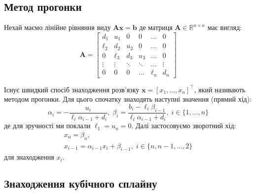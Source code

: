\documentclass[12pt]{extarticle}
\begin{document}
\subsection{Метод прогонки}\label{sub:2-3}

Нехай маємо лінійне рівняння виду $\boldsymbol{A}\mathbf{x} = \mathbf{b}$ де матриця $\boldsymbol{A} \in \mathbb{R}^{n \times n}$ має вигляд:
\[
\boldsymbol{A} = \begin{bmatrix}
    d_1 & u_1 & 0 & 0 & \dots & 0 \\
    \ell_2 & d_2 & u_2 & 0 & \dots & 0 \\
    0 & \ell_3 & d_3 & u_3 & \dots & 0 \\
    \vdots & \vdots & \ddots & \ddots & \dots & \vdots \\
    0 & 0 & 0 & \dots & \ell_n & d_n
\end{bmatrix}
\]

Існує швидкий спосіб знаходження розв'язку $\mathbf{x}=[x_1,\dots,x_n]^{\top}$, який називають методом прогонки. Для цього спочатку знаходять наступні значення (прямий хід):
\[
\alpha_i = -\frac{u_i}{\ell_i\alpha_{i-1} + d_i}, \; \beta_i = \frac{b_i - \ell_i\beta_{i-1}}{\ell_i\alpha_{i-1} + d_i}, \; i \in \{1,\dots,n\}
\]
де для зручності ми поклали $\ell_1=u_n=0$. Далі застосовуємо зворотний хід:
\begin{align*}
x_n = \beta_n, \\
x_{i-1} = \alpha_{i-1}x_i + \beta_{i-1}, \; i \in \{n,n-1,\dots,2\}
\end{align*}
для знаходження $x_i$. 

\subsection*{Знаходження кубічного сплайну}
\end{document}
